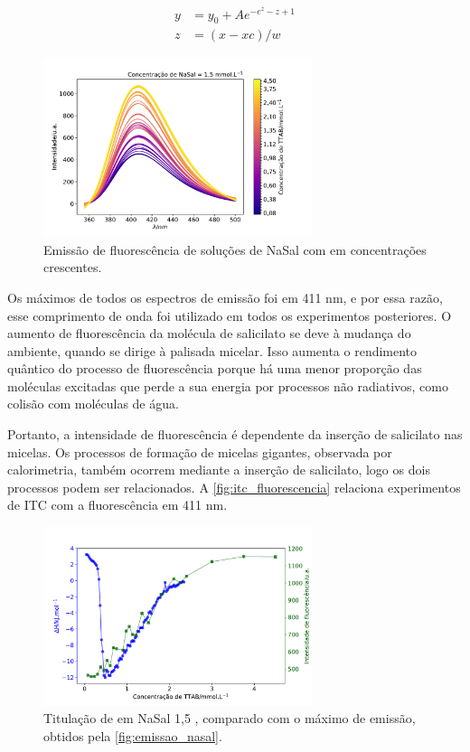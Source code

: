 	\begin{subequations}
		\begin{align}
		y &= y_0 + A e^{-e^{z} - z + 1} \\
		z &= \left( x - xc \right)/w 
		\end{align}
		\label{eqn:ajuste_extremo}
	\end{subequations}
	
	\begin{figure}[h]
		\centering
		\includegraphics[width=0.7\textwidth]{imagens/fluor/emissao_nasal}
		\caption{Emissão de fluorescência de soluções de NaSal com \TTAB{} em concentrações crescentes.}
		\label{fig:emissao_nasal}
	\end{figure}
	
	Os máximos de todos os espectros de emissão foi em 411 nm, e por essa razão, esse comprimento de onda foi utilizado em todos os experimentos posteriores. O aumento de fluorescência da molécula de salicilato se deve à mudança do ambiente, quando se dirige à palisada micelar. Isso aumenta o rendimento quântico do processo de fluorescência porque há uma menor proporção das moléculas excitadas que perde a sua energia por processos não radiativos, como colisão com moléculas de água.
	
	Portanto, a intensidade de fluorescência é dependente da inserção de salicilato nas micelas. Os processos de formação de micelas gigantes, observada por calorimetria, também ocorrem mediante a inserção de salicilato, logo os dois processos podem ser relacionados. A \autoref{fig:itc_fluorescencia} relaciona experimentos de ITC com a fluorescência em 411 nm.
	
	\begin{figure}[h]
		\centering
		\includegraphics[width=0.7\textwidth]{imagens/fluor/itc_fluorescencia}
		\caption{Titulação de  \mM{} em NaSal 1,5 \mM, comparado com o máximo de emissão, obtidos pela \autoref{fig:emissao_nasal}.}
		\label{fig:itc_fluorescencia}
	\end{figure}
	
